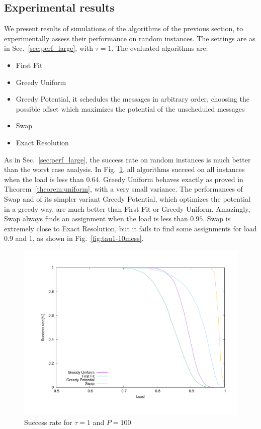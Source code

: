 \documentclass[a4paper,UKenglish,cleveref, autoref, thm-restate]{lipics-v2019}
\begin{document}
\subsection{Experimental results} \label{sec:perf_small}


We present results of simulations of the algorithms of the previous section, to experimentally assess their performance on
random instances. The settings are as in Sec.~\ref{sec:perf_large}, with $\tau = 1$.
The evaluated algorithms are:

\begin{itemize}
	\item First Fit
	\item Greedy Uniform 
	\item Greedy Potential, it schedules the messages in arbitrary order, choosing the possible offset which 
	maximizes the potential of the unscheduled messages
	\item Swap 
	\item Exact Resolution
\end{itemize}

As in Sec.~\ref{sec:perf_large}, the success rate on random instances is much better than the worst case analysis.
In Fig.~\ref{fig:tau1}, all algorithms succeed on all instances when the load is less than $0.64$. Greedy Uniform behaves exactly as proved in Theorem~\ref{theorem:uniform}, with a very small variance. The performances of Swap and of its simpler variant Greedy Potential, which optimizes the potential in a greedy way, are much better than First Fit or Greedy Uniform. Amazingly, Swap always finds an assignment when the load is less than $0.95$. Swap is extremely close to Exact Resolution, but it fails 
to find some assignments for load $0.9$ and $1$, as shown in Fig.~\ref{fig:tau1-10mess}.

\begin{figure}
\begin{center}
\includegraphics[scale=0.3]{success_tau1}
\end{center}
\caption{Success rate for $\tau = 1$ and $P=100$}
\label{fig:tau1}
\end{figure}
\end{document}
